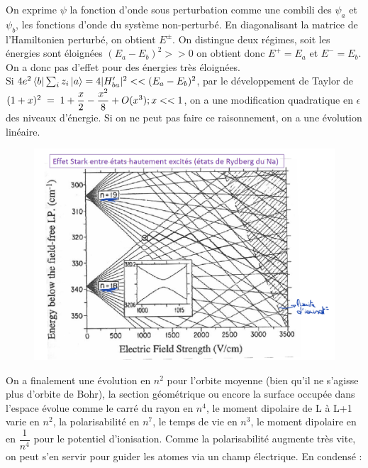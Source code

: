On exprime $\psi$ la fonction d'onde sous perturbation comme une combili des $\psi_a$ et $\psi_b$, les fonctions d'onde du système non-perturbé. En diagonalisant la matrice de l'Hamiltonien perturbé, on obtient $E^{\pm}$. On distingue deux régimes, soit les énergies sont éloignées $(E_a - E_b)^2 >> 0$ on obtient donc $E^+ = E_a$ et $E^- = E_b$. On a donc pas d'effet pour des énergies très éloignées.\\
Si $4e^2\bra{b}\sum_iz_i\ket{a} = 4|H'_{ba}|^2<<(E_a - E_b)^2 $, par le développement de Taylor de $(1 + x)^2\; = \; 1 + \dfrac{x}{2} - \dfrac{x^2}{8} + O(x^3);x<<1$, on a une modification quadratique en $\epsilon$ des niveaux d'énergie. Si on ne peut pas faire ce raisonnement, on a une évolution linéaire.\\

\begin{figure}[tph]
    \centering
    \includegraphics[scale=0.7]{Images2/GrapheStark.PNG}
\end{figure}

On a finalement une évolution en $n^2$ pour l'orbite moyenne (bien qu'il ne s'agisse plus d'orbite de Bohr), la section géométrique ou encore la surface occupée dans l'espace évolue comme le carré du rayon en $n^4$, le moment dipolaire de L à L+1 varie en $n^2$, la polarisabilité en $n^7$, le temps de vie en $n^3$, le moment dipolaire en en $\dfrac{1}{n^4}$ pour le potentiel d'ionisation. Comme la polarisabilité augmente très vite, on peut s'en servir pour guider les atomes via un champ électrique. En condensé :

